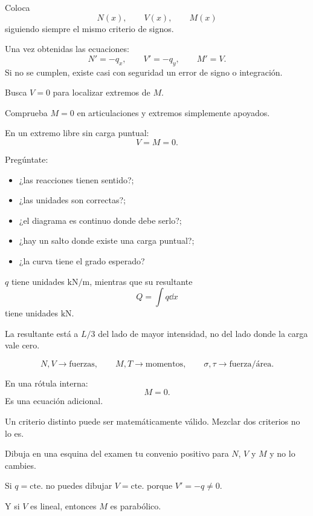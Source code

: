 Coloca
\[
N(x),\qquad V(x),\qquad M(x)
\]
siguiendo siempre el mismo criterio de signos.

Una vez obtenidas las ecuaciones:
\[
N'=-q_x,\qquad V'=-q_y,\qquad M'=V.
\]
Si no se cumplen, existe casi con seguridad un error de signo o integración.

Busca $V=0$ para localizar extremos de $M$.

Comprueba $M=0$ en articulaciones y extremos simplemente apoyados.

En un extremo libre sin carga puntual:
\[
V=M=0.
\]

Pregúntate:
\begin{itemize}
  \item ¿las reacciones tienen sentido?;
  \item ¿las unidades son correctas?;
  \item ¿el diagrama es continuo donde debe serlo?;
  \item ¿hay un salto donde existe una carga puntual?;
  \item ¿la curva tiene el grado esperado?
\end{itemize}


$q$ tiene unidades $\mathrm{kN/m}$, mientras que su resultante
\[
Q=\int q\dd x
\]
tiene unidades $\mathrm{kN}$.

La resultante está a $L/3$ del lado de mayor intensidad, no del lado donde la carga vale cero.

\[
N,V\rightarrow\text{fuerzas},
\qquad
M,T\rightarrow\text{momentos},
\qquad
\sigma,\tau\rightarrow\text{fuerza/área}.
\]

En una rótula interna:
\[
M=0.
\]
Es una ecuación adicional.

Un criterio distinto puede ser matemáticamente válido. Mezclar dos criterios no lo es.

\begin{tip}
Dibuja en una esquina del examen tu convenio positivo para $N$, $V$ y $M$ y no lo cambies.
\end{tip}

Si $q=\text{cte.}$ no puedes dibujar $V=\text{cte.}$ porque $V'=-q\neq0$.

Y si $V$ es lineal, entonces $M$ es parabólico.

